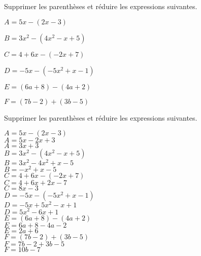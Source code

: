\begin{exercice*}
    Supprimer les parenthèses et réduire les expressions suivantes.
    \begin{itemize}
         \begin{spacing}{1.2}
             \item[] $A= 5x-(2x-3)$
             \item[] $B= 3x^2-(4x^2-x+5)$
             \item[] $C= 4+6x-(-2x+7)$             
             \item[] $D= -5x-(-5x^2+x-1)$
             \item[] $E= (6a+8)-(4a+2)$
             \item[] $F= (7b-2)+(3b-5)$
         \end{spacing}
    \end{itemize}
\end{exercice*}
\begin{corrige}
    Supprimer les parenthèses et réduire les expressions suivantes.    
    \begin{itemize}
        \def\item{}
        \begin{spacing}{1.2}
            \item $A= 5x-(2x-3)$\\
            {\red $A=5x-2x+3$\\$A=3x+3$}\\
            \item $B= 3x^2-(4x^2-x+5)$\\
            {\red $B=3x^2-4x^2+x-5$\\$B=-x^2+x-5$}\\
            \item $C= 4+6x-(-2x+7)$\\
            {\red $C=4+6x+2x-7$\\$C=8x-3$}\\
            \columnbreak
            \item $D= -5x-(-5x^2+x-1)$\\
            {\red $D=-5x+5x^2-x+1$\\$D=5x^2-6x+1$}\\
            \item $E= (6a+8)-(4a+2)$\\
            {\red $E=6a+8-4a-2$\\$E=2a+6$}\\
            \item $F= (7b-2)+(3b-5)$\\
            {\red $F=7b-2+3b-5$\\$F=10b-7$}\\
        \end{spacing}
    \end{itemize}
\end{corrige}

